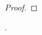 \documentclass[pdftex,11pt,a4paper,oneside]{article}
\theoremstyle{plain}
\begin{document}
\begin{proof}



\end{proof}.
\end{document}
